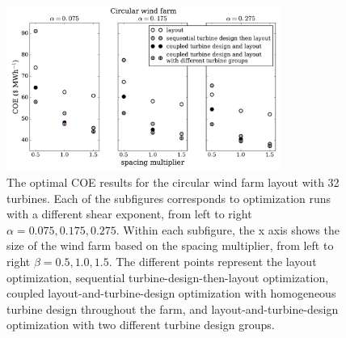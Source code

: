 \begin{figure}[htbp]
  \centering
  \includegraphics[width=0.8\textwidth]{Figures/circular_results1.pdf}
  \caption{\label{circular_results} The optimal COE results for the circular wind farm layout with 32 turbines. Each of the subfigures corresponds to optimization runs with a different shear exponent, from left to right $\alpha=0.075,0.175,0.275$. Within each subfigure, the x axis shows the size of the wind farm based on the spacing multiplier, from left to right $\beta=0.5,1.0,1.5$. The different points represent the layout optimization, sequential turbine-design-then-layout optimization, coupled layout-and-turbine-design optimization with homogeneous turbine design throughout the farm, and layout-and-turbine-design optimization with two different turbine design groups.}
\end{figure}

